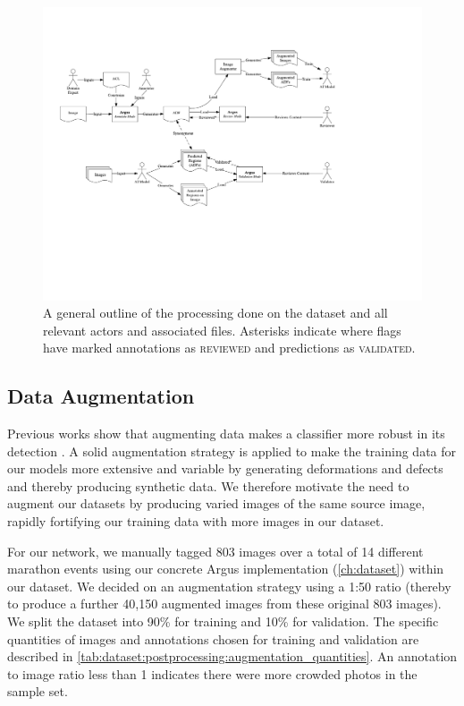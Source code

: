 \begin{landscape}
\begin{figure}[p]
  \centering
  \includegraphics[width=1.1\paperwidth]{images/dataset/overview}
  \caption[Overview of processing made on our dataset]{A general outline of the processing done on the dataset and all relevant actors and associated files. Asterisks indicate where flags have marked annotations as \textsc{reviewed} and predictions as \textsc{validated}.}
  \label{fig:dataset:postprocessing:overal_data_processing}
\end{figure}
\end{landscape}

\subsection{Data Augmentation}
\label{sec:dataset:postprocessing:augmentation}

Previous works show that augmenting data makes a classifier more robust in its detection \citep{Yaeger:1996tq,Baird:1992ih,Wong:2016cv}. A solid augmentation strategy is applied to make the training data for our models more extensive and variable by generating deformations and defects and thereby producing synthetic data. We therefore motivate the need to augment our datasets by producing varied images of the same source image, rapidly fortifying our training data with more images in our dataset.

For our network, we manually tagged 803 images over a total of 14 different marathon events using our concrete Argus implementation (\cref{ch:dataset}) within our dataset. We decided on an augmentation strategy using a 1:50 ratio (thereby to produce a further 40,150 augmented images from these original 803 images). We split the dataset into 90\% for training and 10\% for validation. The specific quantities of images and annotations chosen for training and validation are described in \cref{tab:dataset:postprocessing:augmentation_quantities}. An annotation to image ratio less than 1 indicates there were more crowded photos in the sample set.

